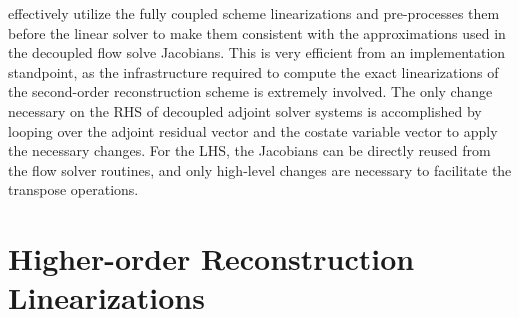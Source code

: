  effectively utilize the
fully coupled scheme linearizations and pre-processes them before the linear
solver to make them consistent with the approximations used in the decoupled
flow solve Jacobians.  This is very efficient from an implementation standpoint,
as the infrastructure required to compute the exact linearizations of the
second-order reconstruction scheme is extremely involved.  The only change
necessary on the RHS of decoupled adjoint solver systems is accomplished by
looping over the adjoint residual vector and the costate variable vector to
apply the necessary changes.  For the LHS, the Jacobians can be directly reused
from the flow solver routines, and only high-level changes are necessary to
facilitate the transpose operations.


\section{Higher-order Reconstruction Linearizations}
\label{sec:higher-order-linearizations}

